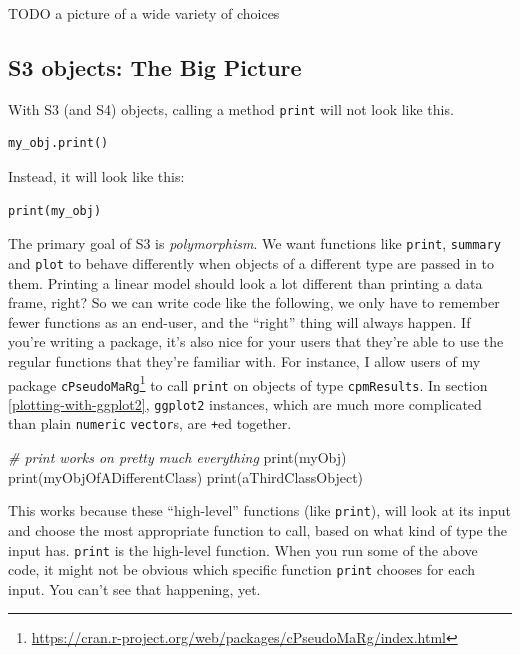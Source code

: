 \documentclass[
  12pt,
]{krantz}
\makeatletter
\newenvironment{Shaded}{\begin{snugshade}}{\end{snugshade}}
\newcommand{\CommentTok}[1]{\textcolor[rgb]{0.37,0.37,0.37}{\textit{#1}}}
\newcommand{\FunctionTok}[1]{\textcolor[rgb]{0,0,0}{#1}}
\newcommand{\NormalTok}[1]{#1}
\renewcommand{\href}[2]{#2\footnote{\url{#1}}}
\newenvironment{kframe}{%
\medskip{}
\setlength{\fboxsep}{.8em}
 \def\at@end@of@kframe{}%
 \ifinner\ifhmode%
  \def\at@end@of@kframe{\end{minipage}}%
  \begin{minipage}{\columnwidth}%
 \fi\fi%
 \def\FrameCommand##1{\hskip\@totalleftmargin \hskip-\fboxsep
 \colorbox{shadecolor}{##1}\hskip-\fboxsep
     \hskip-\linewidth \hskip-\@totalleftmargin \hskip\columnwidth}%
 \MakeFramed {\advance\hsize-\width
   \@totalleftmargin\z@ \linewidth\hsize
   \@setminipage}}%
 {\par\unskip\endMakeFramed%
 \at@end@of@kframe}
\renewenvironment{Shaded}{\begin{kframe}}{\end{kframe}}
\makeatother
\begin{document}
TODO a picture of a wide variety of choices

\hypertarget{s3-objects-the-big-picture}{%
\subsection{S3 objects: The Big Picture}\label{s3-objects-the-big-picture}}

With S3 (and S4) objects, calling a method \texttt{print} will not look like this.

\begin{verbatim}
my_obj.print()
\end{verbatim}

Instead, it will look like this:

\begin{verbatim}
print(my_obj)
\end{verbatim}

The primary goal of S3 is \emph{polymorphism}. We want functions like \texttt{print}, \texttt{summary} and \texttt{plot} to behave differently when objects of a different type are passed in to them. Printing a linear model should look a lot different than printing a data frame, right? So we can write code like the following, we only have to remember fewer functions as an end-user, and the ``right'' thing will always happen. If you're writing a package, it's also nice for your users that they're able to use the regular functions that they're familiar with. For instance, I allow users of my package \href{https://cran.r-project.org/web/packages/cPseudoMaRg/index.html}{\texttt{cPseudoMaRg}} \citep{cpm} to call \texttt{print} on objects of type \texttt{cpmResults}. In section \ref{plotting-with-ggplot2}, \texttt{ggplot2} instances, which are much more complicated than plain \texttt{numeric} \texttt{vector}s, are \texttt{+}ed together.

\begin{Shaded}
\begin{Highlighting}[]
\CommentTok{\# print works on pretty much everything}
\FunctionTok{print}\NormalTok{(myObj)}
\FunctionTok{print}\NormalTok{(myObjOfADifferentClass)}
\FunctionTok{print}\NormalTok{(aThirdClassObject)}
\end{Highlighting}
\end{Shaded}

This works because these ``high-level'' functions (like \texttt{print}), will look at its input and choose the most appropriate function to call, based on what kind of type the input has. \texttt{print} is the high-level function. When you run some of the above code, it might not be obvious which specific function \texttt{print} chooses for each input. You can't see that happening, yet.
\end{document}
